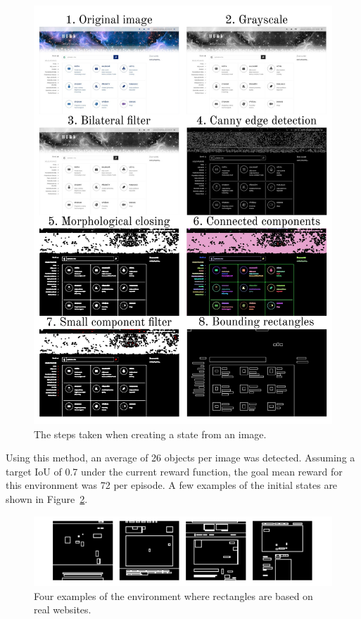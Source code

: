 \documentclass[
  digital,     %
  oneside,     %
  nosansbold,  %
  nocolorbold, %
  lof,         %
  lot,         %
]{fithesis4}
\begin{document}
\begin{figure}
    \centering
    \includegraphics[width=1\linewidth]{diagrams/simple_detector.pdf}
    \caption{The steps taken when creating a state from an image.}
    \label{fig:simple-detector}
\end{figure}

Using this method, an average of 26 objects per image was detected. Assuming a target IoU of 0.7 under the current reward function, the goal mean reward for this environment was 72 per episode. A few examples of the initial states are shown in Figure~\ref{fig:env8}.

\begin{figure}
    \centering
    \includegraphics[width=1\linewidth]{env_examples/env8.pdf}
    \caption{Four examples of the environment where rectangles are based on real websites.}
    \label{fig:env8}
\end{figure}
\end{document}

